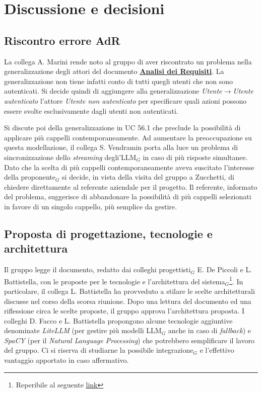 \documentclass[a4paper, 10pt, colorlinks=true, linkcolor=black, urlcolor=blue, citecolor=blue, hidelinks]{article}
\begin{document}
\section{Discussione e decisioni}

\subsection{Riscontro errore AdR}
La collega A. Marini rende noto al gruppo di aver riscontrato un problema nella generalizzazione degli attori del documento \href{https://thebitless.live/RTB/doc_esterna/analisi-dei-requisiti/analisi-dei-requisiti.pdf}{\textbf{Analisi dei Requisiti}}. La generalizzazione non tiene infatti conto di tutti quegli utenti che non sono autenticati. Si decide quindi di aggiungere alla generalizzazione \textit{Utente}$\to$\textit{Utente autenticato} l'attore \textit{Utente non autenticato} per specificare quali azioni possono essere svolte esclusivamente dagli utenti non autenticati.

Si discute poi della generalizzazione in UC 56.1 che preclude la possibilità di applicare più cappelli contemporaneamente. Ad aumentare la preoccupazione su questa modellazione, il collega S. Vendramin porta alla luce un problema di sincronizzazione dello \textit{streaming} degli'LLM$_G$ in caso di più risposte simultanee. Dato che la scelta di più cappelli contemporaneamente aveva suscitato l'interesse della proponente$_G$ si decide, in vista della visita del gruppo a Zucchetti, di chiedere direttamente al referente aziendale per il progetto.
Il referente, informato del problema, suggerisce di abbandonare la possibilità di più cappelli selezionati in favore di un singolo cappello, più semplice da gestire.

\subsection{Proposta di progettazione, tecnologie e architettura}
Il gruppo legge il documento, redatto dai colleghi progettisti$_G$ E. De Piccoli e L. Battistella, con le proposte per le tecnologie e l'architettura del sistema$_G$\footnote{Reperibile al seguente \href{https://www.notion.so/Tecnologie-e-Architettura-del-progetto-Second-Brain-366a3da351ad800189b5fdaa5ab54902?source=copy_link}{link}}. In particolare, il collega L. Battistella ha provveduto a stilare le scelte architetturali discusse nel corso della scorsa riunione. Dopo una lettura del documento ed una riflessione circa le scelte proposte, il gruppo approva l'architettura proposta.
I colleghi D. Facco e L. Battistella propongono alcune tecnologie aggiuntive denominate \textit{LiteLLM} (per gestire più modelli LLM$_G$ anche in caso di \textit{fallback}) e \textit{SpaCY} (per il \textit{Natural Language Processing}) che potrebbero semplificare il lavoro del gruppo. Ci si riserva di studiarne la possibile integrazione$_G$ e l'effettivo vantaggio apportato in caso affermativo.
\end{document}
